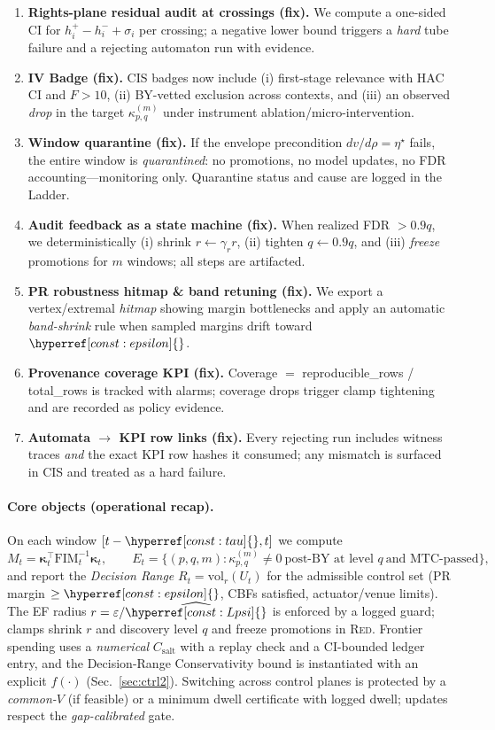 \documentclass[10pt]{article}
\newcommand{\FIM}{\mathrm{FIM}}
\newcommand{\cutq}{q}
\newcommand{\constref}[1]{\hyperref[const:#1]{\ensuremath{\csname constsym#1\endcsname}}}
\begin{document}
\begin{enumerate}[leftmargin=*,itemsep=2pt]
\item \textbf{Rights-plane residual audit at crossings (fix).} We compute a one-sided CI for $h_i^+-h_i^-+\sigma_i$ per crossing; a negative lower bound triggers a \emph{hard} tube failure and a rejecting automaton run with evidence.
\item \textbf{IV Badge (fix).} CIS badges now include (i) first-stage relevance with HAC CI and $F\!>\!10$, (ii) BY-vetted exclusion across contexts, and (iii) an observed \emph{drop} in the target $\kappa_{p,q}^{(m)}$ under instrument ablation/micro-intervention.
\item \textbf{Window quarantine (fix).} If the envelope precondition $dv/d\rho{=}\eta^\star$ fails, the entire window is \emph{quarantined}: no promotions, no model updates, no FDR accounting—monitoring only. Quarantine status and cause are logged in the Ladder.
\item \textbf{Audit feedback as a state machine (fix).} When realized FDR $>\!0.9\cutq$, we deterministically (i) shrink $r\!\leftarrow\!\gamma_r r$, (ii) tighten $\cutq\!\leftarrow\!0.9\cutq$, and (iii) \emph{freeze} promotions for $m$ windows; all steps are artifacted.
\item \textbf{PR robustness hitmap \& band retuning (fix).} We export a vertex/extremal \emph{hitmap} showing margin bottlenecks and apply an automatic \emph{band-shrink} rule when sampled margins drift toward $\constref{epsilon}$.
\item \textbf{Provenance coverage KPI (fix).} Coverage $=$ reproducible\_rows / total\_rows is tracked with alarms; coverage drops trigger clamp tightening and are recorded as policy evidence.
\item \textbf{Automata $\rightarrow$ KPI row links (fix).} Every rejecting run includes witness traces \emph{and} the exact KPI row hashes it consumed; any mismatch is surfaced in CIS and treated as a hard failure.
\end{enumerate}

\paragraph{Core objects (operational recap).}
On each window $[t-\constref{tau},t]$ we compute
\[
M_t=\bm\kappa_t^\top \FIM_t^{-1}\bm\kappa_t,\qquad
E_t=\{(p,q,m): \kappa_{p,q}^{(m)}\neq 0\ \text{post-BY at level }\cutq\ \text{and MTC-passed}\},
\]
and report the \emph{Decision Range} $R_t=\mathrm{vol}_r(U_t)$ for the admissible control set (PR margin $\ge\constref{epsilon}$, CBFs satisfied, actuator/venue limits). The EF radius $r=\varepsilon/\widehat{\constref{Lpsi}}$ is enforced by a logged guard; clamps shrink $r$ and discovery level $\cutq$ and freeze promotions in \textsc{Red}. Frontier spending uses a \emph{numerical} $C_{\mathrm{salt}}$ with a replay check and a CI-bounded ledger entry, and the Decision-Range Conservativity bound is instantiated with an explicit $f(\cdot)$ (Sec.~\ref{sec:ctrl2}). Switching across control planes is protected by a \emph{common-$V$} (if feasible) or a minimum dwell certificate with logged dwell; updates respect the \emph{gap-calibrated} gate.
\end{document}
